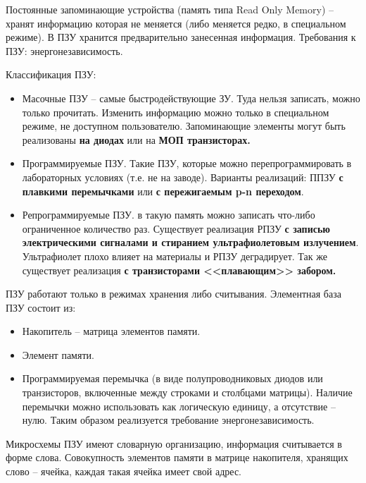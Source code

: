 \documentclass[a4paper,12pt]{article}
\begin{document}
	Постоянные запоминающие устройства (память типа Read Only Memory) -- хранят информацию которая не меняется (либо меняется редко, в специальном режиме). В ПЗУ хранится предварительно занесенная информация. 
	Требования к ПЗУ: энергонезависимость. 
	
	Классификация ПЗУ: 
	
	\begin{itemize}
		\item Масочные ПЗУ -- самые быстродействующие ЗУ. Туда нельзя записать, можно только прочитать. Изменить информацию можно только в специальном режиме, не доступном пользователю. Запоминающие элементы могут быть реализованы \textbf{на диодах} или на \textbf{МОП транзисторах.}
		\item Программируемые ПЗУ. Такие ПЗУ, которые можно перепрограммировать в лабораторных условиях (т.е. не на заводе). Варианты реализаций: ППЗУ \textbf{с плавкими перемычками} или \textbf{с пережигаемым p-n переходом}.
		\item Репрограммируемые ПЗУ. в такую память можно записать что-либо ограниченное количество раз. Существует реализация РПЗУ \textbf{с записью электрическими сигналами и стиранием ультрафиолетовым излучением}. Ультрафиолет плохо влияет на материалы и РПЗУ деградирует. Так же существует реализация \textbf{с транзисторами <<плавающим>> забором.}
	\end{itemize}

	ПЗУ работают только в режимах хранения либо считывания. Элементная база ПЗУ состоит из:
	\begin{itemize}
		\item Накопитель -- матрица элементов памяти.
		\item Элемент памяти.
		\item Программируемая перемычка (в виде полупроводниковых диодов или транзисторов, включенные между строками и столбцами матрицы). Наличие перемычки можно использовать как логическую единицу, а отсутствие -- нулю. Таким образом реализуется требование энергонезависимость.
	\end{itemize}

	Микросхемы ПЗУ имеют словарную организацию, информация считывается в форме слова. Совокупность элементов памяти в матрице накопителя, хранящих слово -- ячейка, каждая такая ячейка имеет свой адрес.
\end{document}
